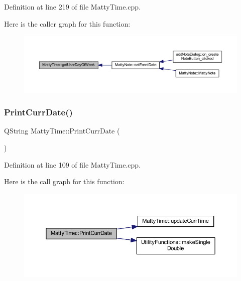 Definition at line 219 of file Matty\+Time.\+cpp.

Here is the caller graph for this function\+:
\nopagebreak
\begin{figure}[H]
\begin{center}
\leavevmode
\includegraphics[width=350pt]{classMattyTime_ad2f12ac7d1a959ee9e19a4eac30484fd_icgraph}
\end{center}
\end{figure}
\hypertarget{classMattyTime_af87198affde58c9f254dbf1601fb9f1e}{}\label{classMattyTime_af87198affde58c9f254dbf1601fb9f1e} 
\subsubsection{\texorpdfstring{Print\+Curr\+Date()}{PrintCurrDate()}}
{\footnotesize\ttfamily Q\+String Matty\+Time\+::\+Print\+Curr\+Date (\begin{DoxyParamCaption}{ }\end{DoxyParamCaption})\hspace{0.3cm}{\ttfamily [static]}}



Definition at line 109 of file Matty\+Time.\+cpp.

Here is the call graph for this function\+:
\nopagebreak
\begin{figure}[H]
\begin{center}
\leavevmode
\includegraphics[width=350pt]{classMattyTime_af87198affde58c9f254dbf1601fb9f1e_cgraph}
\end{center}
\end{figure}
\hypertarget{classMattyTime_ac5ecfd2ff5329b3476906b39bbf02ae3}{}\label{classMattyTime_ac5ecfd2ff5329b3476906b39bbf02ae3} 
